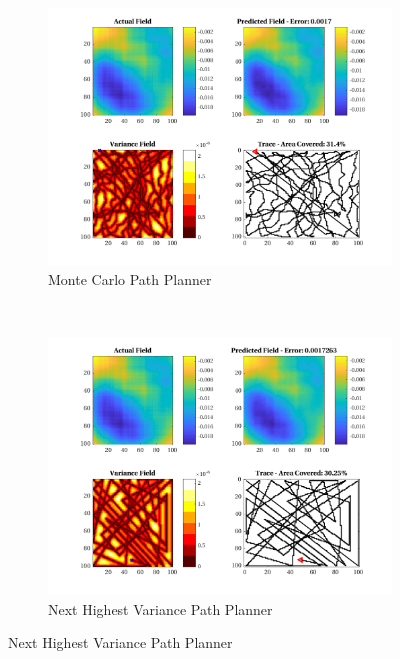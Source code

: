 \begin{figure}[htb!]
    \centering
    \begin{subfigure}[t]{0.5\textwidth}
        \centering
        \includegraphics[width=\linewidth]{figures/hbresults/mc_30p_100x100_sf_25_seed_2.png}
        \captionsetup{skip=0.10\baselineskip,size=footnotesize}
        \caption{Monte Carlo Path Planner}
    \end{subfigure}%
    ~ 
    \begin{subfigure}[t]{0.5\textwidth}
        \centering
        \includegraphics[width=\linewidth]{figures/hbresults/nhv_30p_100x100_sf_25_seed_2.png}
        \captionsetup{skip=0.10\baselineskip,size=footnotesize}
        \caption{Next Highest Variance Path Planner}

\end{subfigure}
\end{figure}

